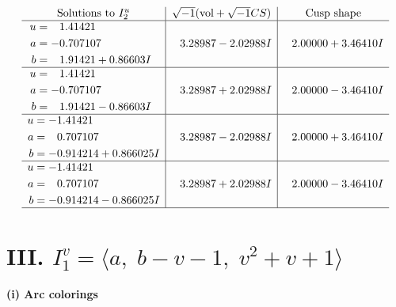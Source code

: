 \documentclass[1p]{elsarticle_modified}
\theoremstyle{definition}
\newcommand{\I}{\sqrt{-1}}
\begin{document}
$$\begin{array}{c|c|c}  
\text{Solutions to }I^u_{2}& \I (\text{vol} + \sqrt{-1}CS) & \text{Cusp shape}\\
 \hline 
\begin{aligned}
u &= \phantom{-}1.41421\phantom{ +0.000000I} \\
a &= -0.707107\phantom{ +0.000000I} \\
b &= \phantom{-}1.91421 + 0.86603 I\end{aligned}
 & \phantom{-}3.28987 - 2.02988 I & \phantom{-}2.00000 + 3.46410 I \\ \hline\begin{aligned}
u &= \phantom{-}1.41421\phantom{ +0.000000I} \\
a &= -0.707107\phantom{ +0.000000I} \\
b &= \phantom{-}1.91421 - 0.86603 I\end{aligned}
 & \phantom{-}3.28987 + 2.02988 I & \phantom{-}2.00000 - 3.46410 I \\ \hline\begin{aligned}
u &= -1.41421\phantom{ +0.000000I} \\
a &= \phantom{-}0.707107\phantom{ +0.000000I} \\
b &= -0.914214 + 0.866025 I\end{aligned}
 & \phantom{-}3.28987 - 2.02988 I & \phantom{-}2.00000 + 3.46410 I \\ \hline\begin{aligned}
u &= -1.41421\phantom{ +0.000000I} \\
a &= \phantom{-}0.707107\phantom{ +0.000000I} \\
b &= -0.914214 - 0.866025 I\end{aligned}
 & \phantom{-}3.28987 + 2.02988 I & \phantom{-}2.00000 - 3.46410 I\\
 \hline 
 \end{array}$$\newpage\newpage\renewcommand{\arraystretch}{1}
\centering \section*{III. $I^v_{1}= \langle a,\;b- v-1,\;v^2+v+1 \rangle$}
\flushleft \textbf{(i) Arc colorings}\\
\end{document}
